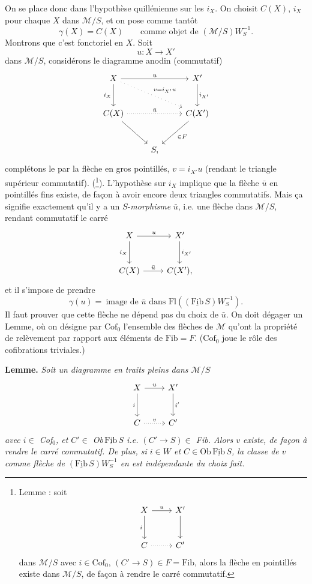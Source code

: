 \documentclass[11pt]{article}
\newcommand{\printedpage}[1]{\marginpar{\footnotesize p.~#1}}
\newcommand{\msp}[1]{\marginpar{\footnotesize [#1]}}
\newcommand{\cM}{\mathcal{M}}
\newcommand{\Fib}{\underline{\mathrm{Fib}}\,}
\newcommand{\Fl}{\mathrm{Fl}}
\newcommand{\Ob}{\mathrm{Ob}}
\begin{document}
\msp{page 90}On se place donc dans l'hypothèse quillénienne sur les $i_X$. On choisit $C(X)$, $i_X$ pour
chaque $X$ dans $\cM/S$, et on pose comme tantôt
\[
\gamma(X)=C(X) \qquad \text{comme objet de $(\cM/S)W_S^{-1}$.}
\]
Montrons que c'est fonctoriel en $X$. Soit
\[
u:X\longrightarrow X'
\]
dans $\cM/S$, considérons le diagramme anodin (commutatif)
\[
\begin{tikzcd}[row sep=large]
X \arrow[rr, "u"] \arrow[d, "i_X"'] \arrow[drr, loosely dotted, "v=i_{X'}u"] & & X' \arrow[d, "i_{X'}"] \\
C(X) \arrow[rr, dotted, "\bar{u}"] \arrow[dr] & & C(X') \arrow[dl, "\in F"] \\
& S, &
\end{tikzcd}
\]
complétons le par la flèche en gros pointillés, $v=i_{X'}u$ (rendant le triangle supérieur
commutatif). (\footnote[54]{Lemme : soit
\[
\begin{tikzcd}[ampersand replacement=\&, row sep=large]
X \arrow[r, "u"] \arrow[d, "i"'] \& X' \arrow[d] \\
C \arrow[r, dotted] \& C'
\end{tikzcd}
\]
dans $\cM/S$ avec $i\in\mathrm{Cof}_0$, $(C'\longrightarrow S)\in F=\mathrm{Fib}$, alors la flèche en pointillés existe dans $\cM/S$, de façon
à rendre le carré commutatif.}). L'hypothèse sur $i_X$ implique que la flèche $\bar{u}$ en pointillés fins existe,
de façon à avoir encore deux triangles commutatifs. Mais ça signifie exactement qu'il y a
un $S$-\textit{morphisme} $\bar{u}$, i.e. une flèche dans $\cM/S$, rendant commutatif le carré
\printedpage{57}
\[
\begin{tikzcd}[row sep=large]
X \arrow[r, "u"] \arrow[d, "i_X"'] & X' \arrow[d, "i_{X'}"] \\
C(X) \arrow[r, "\bar{u}"] & C(X'),
\end{tikzcd}
\]
\msp{page 91}et il s'impose de prendre
\[
\gamma(u)=\ \text{image de $\bar{u}$ dans $\Fl((\Fib S)W_S^{-1})$.}
\]
Il faut prouver que cette flèche ne dépend pas du choix de $\bar{u}$. On doit dégager un Lemme,
où on désigne par $\mathrm{Cof}_0$ l'ensemble des flèches de $\cM$ qu'ont %
la propriété de relèvement par
rapport aux éléments de $\mathrm{Fib}=F$. ($\mathrm{Cof}_0$ joue le rôle des cofibrations triviales.)

\textbf{Lemme.} \textit{Soit un diagramme en traits pleins dans $\cM/S$}
\[
\begin{tikzcd}[row sep=large]
X \arrow[r, "u"] \arrow[d, "i"'] & X' \arrow[d, "i'"] \\
C \arrow[r, dotted, "v"] & C'
\end{tikzcd}
\]
\textit{avec $i\in$ Cof$_0$, et $C'\in$ Ob$\,\Fib S$ i.e. $(C'\longrightarrow S)\in$ Fib. Alors $v$ existe, de façon à rendre
le carré commutatif. De plus, si $i\in W$ et $C\in\Ob\,\Fib S$, la classe de $v$ comme flèche de
$(\Fib S)W_S^{-1}$ en est indépendante du choix fait.}
\end{document}
